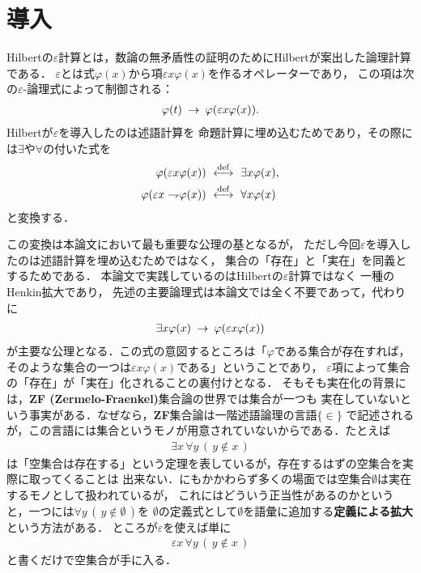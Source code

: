 \section{導入}
	Hilbert\cite{Hilbert}の$\varepsilon$計算とは，数論の無矛盾性の証明のためにHilbertが案出した論理計算である．
	$\varepsilon$とは式$\varphi(x)$から項$\varepsilon x \varphi(x)$を作るオペレーターであり，
	この項は次の$\varepsilon$-論理式によって制御される：
	\begin{align}
		\varphi(t) \hspace{0.25em}\rightarrow\hspace{0.25em} \varphi(\varepsilon x \varphi(x)).
		\label{fom:introduction_1}
	\end{align}
	Hilbertが$\varepsilon$を導入したのは述語計算を
	命題計算に埋め込むためであり，その際には$\exists$や$\forall$の付いた式を
	\begin{align}
		\varphi(\varepsilon x \varphi(x)) &\ \overset{\mathrm{def}}{\longleftrightarrow}\  \exists x \varphi(x), \\
		\varphi(\varepsilon x \rightharpoondown\hspace{-0.25em} \varphi(x)) &\ \overset{\mathrm{def}}{\longleftrightarrow}\  \forall x \varphi(x)
	\end{align}
	と変換する．
	
	この変換は本論文において最も重要な公理の基となるが，
	ただし今回$\varepsilon$を導入したのは述語計算を埋め込むためではなく，
	集合の「存在」と「実在」を同義とするためである．
	本論文で実践しているのはHilbertの$\varepsilon$計算ではなく
	一種のHenkin拡大であり，%
	先述の主要論理式は本論文では全く不要であって，代わりに
	\begin{align}
		\exists x \varphi(x) \hspace{0.25em}\rightarrow\hspace{0.25em} \varphi(\varepsilon x \varphi(x))
		\label{fom:introduction_2}
	\end{align}
	が主要な公理となる．この式の意図するところは「$\varphi$である集合が存在すれば，
	そのような集合の一つは$\varepsilon x \varphi(x)$である」ということであり，
	$\varepsilon$項によって集合の「存在」が「実在」化されることの裏付けとなる．
	そもそも実在化の背景には，{\bf ZF (Zermelo-Fraenkel)}集合論の世界では集合が一つも
	実在していないという事実がある．なぜなら，{\bf ZF}集合論は一階述語論理の言語$\{\in\}$
	で記述されるが，この言語には集合というモノが用意されていないからである．たとえば
	\begin{align}
		\exists x\, \forall y\, (\, y \notin x\, )
	\end{align}
	は「空集合は存在する」という定理を表しているが，存在するはずの空集合を実際に取ってくることは
	出来ない．にもかかわらず多くの場面では空集合$\emptyset$は実在するモノとして扱われているが，
	これにはどういう正当性があるのかというと，一つには$\forall y\, (\, y \notin \emptyset\, )$を
	$\emptyset$の定義式として$\emptyset$を語彙に追加する{\bf 定義による拡大}
	という方法がある．
	ところが$\varepsilon$を使えば単に
	\begin{align}
		\varepsilon x\, \forall y\, (\, y \notin x\, )
	\end{align}
	と書くだけで空集合が手に入る．
	
